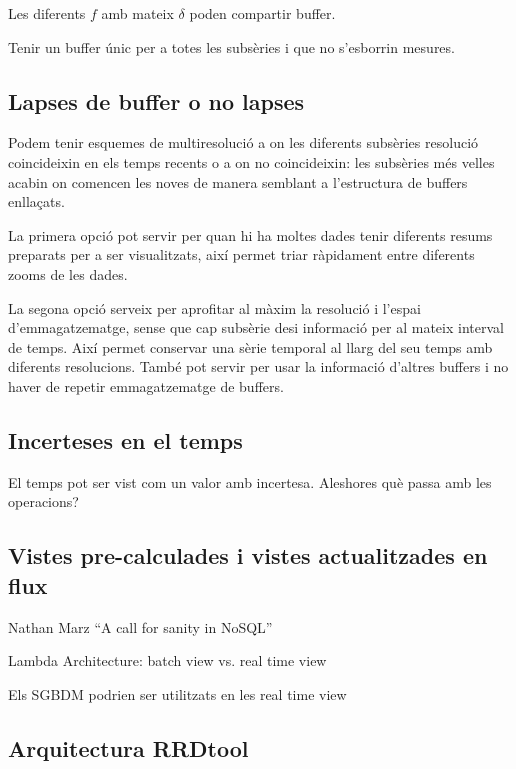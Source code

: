 Les diferents $f$ amb mateix $\delta$ poden compartir buffer.


Tenir un buffer únic per a totes les subsèries i que no s'esborrin mesures.




\subsection{Lapses de buffer o no lapses}

Podem tenir esquemes de multiresolució a on les diferents subsèries
resolució coincideixin en els temps recents o a on no coincideixin:
les subsèries més velles acabin on comencen les noves de manera
semblant a l'estructura de buffers enllaçats.

La primera opció pot servir per quan hi ha moltes dades tenir diferents resums preparats per a ser visualitzats, així permet triar ràpidament entre diferents zooms de les dades.

La segona opció serveix per aprofitar al màxim la resolució i l'espai d'emmagatzematge, sense que cap subsèrie desi informació per al mateix interval de temps. Així permet conservar una sèrie temporal al llarg del seu temps amb diferents resolucions. També pot servir per usar la informació d'altres buffers i no haver de repetir emmagatzematge de buffers.


\subsection{Incerteses en el temps}


El temps pot ser vist com un valor amb incertesa. Aleshores què passa amb les operacions?





\subsection{Vistes pre-calculades i vistes actualitzades en flux}

Nathan Marz ``A call for sanity in NoSQL''

Lambda Architecture: batch view vs. real time view

Els SGBDM podrien ser utilitzats en les real time view




\subsection{Arquitectura RRDtool}


